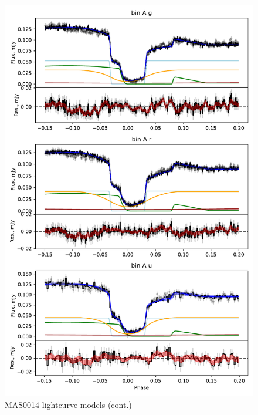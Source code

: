 \begin{figure}
    \centering
    \includegraphics[width=\textwidth]{figures/results/MASOT0014/MASOT0014_3.pdf}
    \caption{MAS0014 lightcurve models (cont.)}
    \label{fig:MAS0014 all lightcurves cont 2}
\end{figure}


